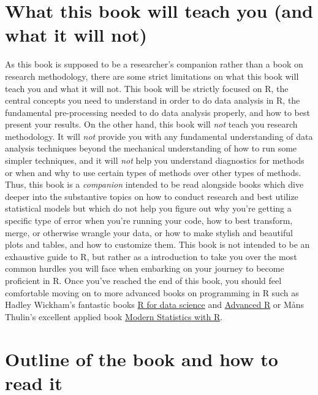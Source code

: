 \documentclass[
]{book}
\begin{document}
\hypertarget{what-this-book-will-teach-you-and-what-it-will-not}{%
\section*{What this book will teach you (and what it will not)}\label{what-this-book-will-teach-you-and-what-it-will-not}}

As this book is supposed to be a researcher's companion rather than a book on research methodology, there are some strict limitations on what this book will teach you and what it will not. This book will be strictly focused on R, the central concepts you need to understand in order to do data analysis in R, the fundamental pre-processing needed to do data analysis properly, and how to best present your results. On the other hand, this book will \emph{not} teach you research methodology. It will \emph{not} provide you with any fundamental understanding of data analysis techniques beyond the mechanical understanding of how to run some simpler techniques, and it will \emph{not} help you understand diagnostics for methods or when and why to use certain types of methods over other types of methods. Thus, this book is a \emph{companion} intended to be read alongside books which dive deeper into the substantive topics on how to conduct research and best utilize statistical models but which do not help you figure out why you're getting a specific type of error when you're running your code, how to best transform, merge, or otherwise wrangle your data, or how to make stylish and beautiful plots and tables, and how to customize them. This book is not intended to be an exhaustive guide to R, but rather as a introduction to take you over the most common hurdles you will face when embarking on your journey to become proficient in R. Once you've reached the end of this book, you should feel comfortable moving on to more advanced books on programming in R such as Hadley Wickham's fantastic books \href{https://r4ds.had.co.nz/}{R for data science} and \href{https://adv-r.hadley.nz/}{Advanced R} or Måns Thulin's excellent applied book \href{https://modernstatisticswithr.com/}{Modern Statistics with R}.

\hypertarget{outline-of-the-book-and-how-to-read-it}{%
\section*{Outline of the book and how to read it}\label{outline-of-the-book-and-how-to-read-it}}
\end{document}
